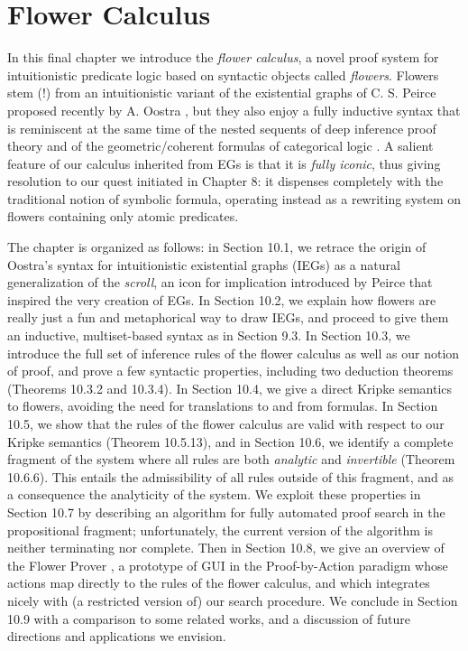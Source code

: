 \documentclass[11pt]{article}
\begin{document}
\section{Flower Calculus}

In this final chapter we introduce the \emph{flower calculus}, a novel proof system for
intuitionistic predicate logic based on syntactic objects called \emph{flowers}. Flowers stem (!) from an intuitionistic variant of the existential graphs of C. S. Peirce
proposed recently by A. Oostra
\cite{oostra_graficos_2010,oostra_graficos_2011,zalamea_advances_2022}, but they also enjoy a fully inductive syntax that is reminiscent at the same time of the nested sequents of deep inference
proof theory \cite{brunnler_deep_2009,fitting-nested-2014,guenot_nested_2013,lyon_nested_2021} and of
the geometric/coherent formulas of categorical logic
\cite{skolem_geometric,negri_geometric,Johnstone2002-rm}. A salient feature of our calculus
inherited from EGs is that it is \emph{fully iconic}, thus giving resolution to our quest initiated
in Chapter 8: it dispenses completely with the traditional notion of symbolic formula, operating
instead as a rewriting system on flowers containing only atomic predicates. 

The chapter is organized as follows: in Section 10.1, we retrace the origin of Oostra's syntax for
intuitionistic existential graphs (IEGs) as a natural generalization of the \emph{scroll}, an icon
for implication introduced by Peirce that inspired the very creation of EGs. In Section 10.2, we
explain how flowers are really just a fun and metaphorical way to draw IEGs, and proceed to give
them an inductive, multiset-based syntax as in Section 9.3. In Section 10.3, we introduce the full
set of inference rules of the flower calculus as well as our notion of proof, and prove a few
syntactic properties, including two deduction theorems (Theorems 10.3.2 and 10.3.4). In Section
10.4, we give a direct Kripke semantics to flowers, avoiding the need for translations to and from
formulas. In Section 10.5, we show that the rules of the flower calculus are valid with respect to
our Kripke semantics (Theorem 10.5.13), and in Section 10.6, we identify a complete fragment of the
system where all rules are both \emph{analytic} and \emph{invertible} (Theorem 10.6.6). This entails
the admissibility of all rules outside of this fragment, and as a consequence the analyticity of the
system. We exploit these properties in Section 10.7 by describing an algorithm for fully automated
proof search in the propositional fragment; unfortunately, the current version of the algorithm is
neither terminating nor complete. Then in Section 10.8, we give an overview of the Flower\,\,Prover
\cite{flower-prover}, a prototype of GUI in the Proof-by-Action paradigm whose actions map directly
to the rules of the flower calculus, and which integrates nicely with (a restricted version of) our
search procedure. We conclude in Section 10.9 with a comparison to some related works, and a
discussion of future directions and applications we envision.

\printbibliography
\end{document}
